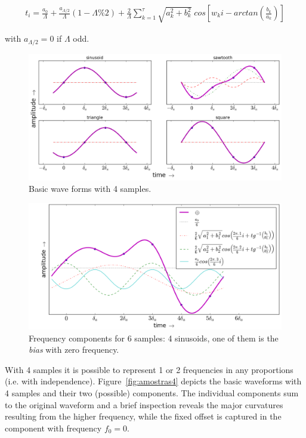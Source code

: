 \begin{equation}\label{eq:reconsCompleta}
\begin{split}
	t_i = \frac{a_0}{\Lambda} + \frac{ a_{\Lambda/2}}{\Lambda}(1-\Lambda\% 2) + \frac{2}{\Lambda}\sum_{k=1}^{\tau}\sqrt{a_k^2 + b_k^2} \; cos\left[w_k i - arctan\left(\frac{b_k}{a_k}\right)\right]
\end{split}
\end{equation}

\noindent with $a_{\Lambda/2}=0$ if $\Lambda$ odd.

\begin{figure}
    \centering
        \includegraphics[width=.9\textwidth]{figures/amostras4formas___}
    \caption{Basic wave forms with 4 samples.}
        \label{fig:formas4}
\end{figure}

\begin{figure}[!h!]
    \centering
        \includegraphics[width=.7\textwidth]{figures/amostras6__}
    \caption{Frequency components for 6 samples: 4 sinusoids, one of them is the \emph{bias} with zero frequency.}
        \label{fig:amostras6}
\end{figure}

With 4 samples it is possible to represent 1 or 2 frequencies in any proportions (i.e. with independence). Figure~\ref{fig:amostras4} depicts the basic waveforms with 4 samples and their two (possible) components. The individual components sum to the original waveform and a brief inspection reveals the major curvatures resulting from the higher frequency, while the fixed offset is captured in the component with frequency $f_0=0$.

